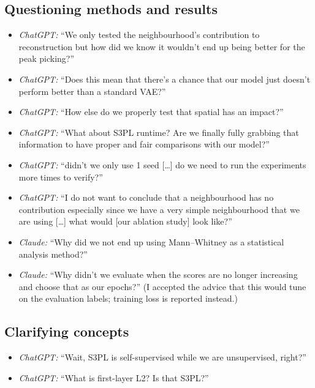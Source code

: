 \subsection*{Questioning methods and results}
\begin{itemize}
  \item \emph{ChatGPT:} ``We only tested the neighbourhood's contribution to
        reconstruction but how did we know it wouldn't end up being better for
        the peak picking?''
  \item \emph{ChatGPT:} ``Does this mean that there's a chance that our model
        just doesn't perform better than a standard VAE?''
  \item \emph{ChatGPT:} ``How else do we properly test that spatial has an
        impact?''
  \item \emph{ChatGPT:} ``What about S3PL runtime? Are we finally fully grabbing
        that information to have proper and fair comparisons with our model?''
  \item \emph{ChatGPT:} ``didn't we only use 1 seed [\ldots] do we need
        to run the experiments more times to verify?''
  \item \emph{ChatGPT:} ``I do not want to conclude that a neighbourhood
        has no contribution especially since we have a very simple neighbourhood
        that we are using [\ldots] what would [our ablation study] look like?''
  \item \emph{Claude:} ``Why did we not end up using Mann--Whitney as a
        statistical analysis method?''
  \item \emph{Claude:} ``Why didn't we evaluate when the scores are no
        longer increasing and choose that as our epochs?'' (I accepted the
        advice that this would tune on the evaluation labels; training loss is
        reported instead.)
\end{itemize}

\subsection*{Clarifying concepts}
\begin{itemize}
  \item \emph{ChatGPT:} ``Wait, S3PL is self-supervised while we are
        unsupervised, right?''
  \item \emph{ChatGPT:} ``What is first-layer L2? Is that S3PL?''
\end{itemize}

